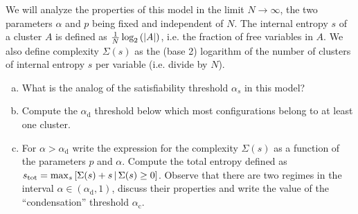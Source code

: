 \documentclass[a4paper,oneside,12pt]{article}
\begin{document}
We will analyze the properties of this model in the limit $ N \to \infty $, the two parameters $ \alpha $ and $ p $ being fixed and independent of $ N $. 
The internal entropy $ s $ of a cluster $ A $ is defined as $ \frac{1}{N} \log_2 \left(  \left| A \right|  \right) $, i.e. the fraction of free variables in $ A $. 
We also define complexity $ \Sigma(s) $ as the (base 2) logarithm of the number of clusters of internal entropy $ s $ per variable (i.e. divide by $ N $).

\begin{enumerate}[(a)]
\item   What is the analog of the satisfiability threshold $ \alpha_s $ in this model?
\item   Compute the $ \alpha_{\mathrm{d}} $ threshold below which most configurations belong to at least one cluster.
\item   For $ \alpha > \alpha_{\mathrm{d}} $ write the expression for the complexity $ \Sigma(s) $ as a function of the parameters $ p $ and $ \alpha $. 
        Compute the total entropy defined as $ s_{\mathrm{tot}} = \max_s \left\lbrack  \Sigma(s) + s  \,\middle|\,  \Sigma(s) \ge 0  \right\rbrack $. 
        Observe that there are two regimes in the interval $ \alpha \in (\alpha_{\mathrm{d}},1) $, discuss their properties and write the value of the ``condensation'' threshold $ \alpha_{\mathrm{c}} $.
\end{enumerate}
\end{document}
